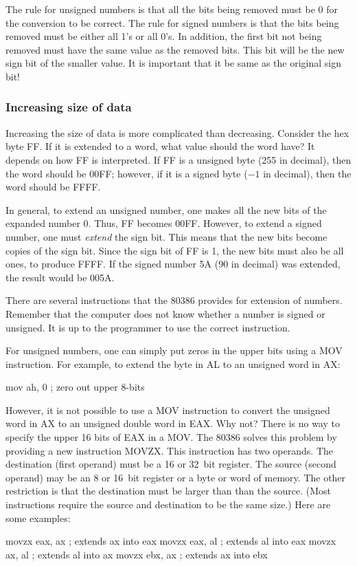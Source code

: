 The rule for unsigned numbers is that all the bits being removed must
be 0 for the conversion to be correct. The rule for signed numbers is
that the bits being removed must be either all 1's or all 0's. In
addition, the first bit not being removed must have the same value as
the removed bits. This bit will be the new sign bit of the smaller value.
It is important that it be same as the original sign bit!

\subsubsection{Increasing size of data}

Increasing the size of data is more complicated than
decreasing. Consider the hex byte FF. If it is extended to a word,
what value should the word have?  It depends on how FF is
interpreted. If FF is a unsigned byte (255 in decimal), then the word
should be 00FF; however, if it is a signed byte ($-1$ in decimal),
then the word should be FFFF.

In general, to extend an unsigned number, one makes all the new bits
of the expanded number 0. Thus, FF becomes 00FF. However, to extend a
signed number, one must \emph{extend} the sign
bit.  This means that the new bits become
copies of the sign bit. Since the sign bit of FF is 1, the new bits
must also be all ones, to produce FFFF. If the signed number 5A (90 in
decimal) was extended, the result would be 005A.

There are several instructions that the 80386 provides for extension of
numbers. Remember that the computer does not know whether a number is signed
or unsigned. It is up to the programmer to use the correct instruction.

For unsigned numbers, one can simply put zeros in the upper bits using a
{\code MOV} instruction. For example, to extend the byte in AL to an unsigned
word in AX:
\begin{AsmCodeListing}[numbers=none,frame=none]
      mov    ah, 0   ; zero out upper 8-bits
\end{AsmCodeListing}
However, it is not possible to use a {\code MOV} instruction to
convert the unsigned word in AX to an unsigned double word in EAX. Why
not? There is no way to specify the upper 16 bits of EAX in a {\code
MOV}. The 80386 solves this problem by providing a new instruction
{\code MOVZX}.  This instruction has two operands. The destination
(first operand) must be a 16 or 32~bit register.  The source (second
operand) may be an 8 or 16~bit register or a byte or word of
memory. The other restriction is that the destination must be larger than
than the source. (Most instructions require the source and destination to be
the same size.) Here are some examples:
\begin{AsmCodeListing}[numbers=none,frame=none]
      movzx  eax, ax      ; extends ax into eax
      movzx  eax, al      ; extends al into eax
      movzx  ax, al       ; extends al into ax
      movzx  ebx, ax      ; extends ax into ebx
\end{AsmCodeListing}

